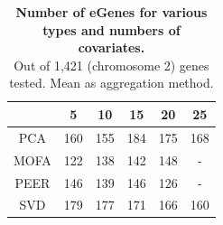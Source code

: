 
\begin{table}[h]
    \centering
    \begin{tabular}{c|c c c c c}
    &       5 & 10 & 15 & 20 & 25  \\
    \hline
    PCA   & 160 & 155 &  184 & 175 & 168 \\
    MOFA  & 122 & 138 &  142 & 148 & -   \\
    PEER  & 146 & 139 &  146 & 126 & -   \\
    SVD   & 179 & 177 &  171 & 166 & 160 \\
    \end{tabular}
    \caption[Number and type of covariate comparison]{\textbf{Number of eGenes for various types and numbers of covariates.}\\
    Out of 1,421 (chromosome 2) genes tested.
    Mean as aggregation method.}
    \label{tab:covariates}
\end{table}


